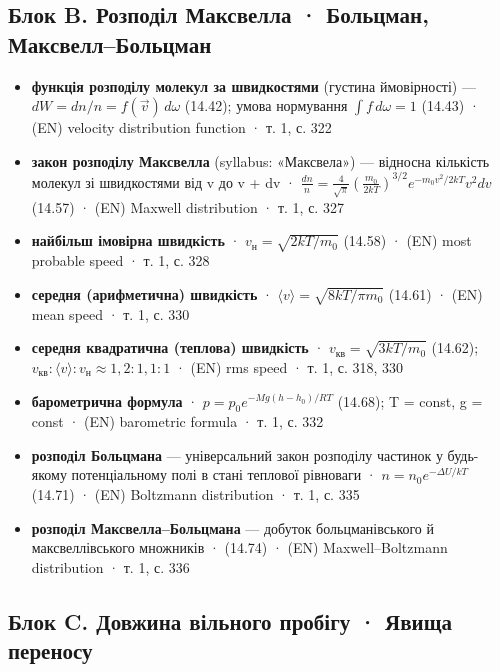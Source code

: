 \documentclass[11pt,a4paper,oneside]{book}
\newcommand{\book}{}
\begin{document}
\subsection*{Блок B. Розподіл Максвелла · Больцман, Максвелл–Больцман}

\begin{itemize}
\item \textbf{функція розподілу молекул за швидкостями} (густина ймовірності) — $dW = dn/n = f(\vec v)\,d\omega$ (14.42); умова нормування $\int f\,d\omega = 1$ (14.43) · (EN) velocity distribution function · \book{} т. 1, с. 322
\item \textbf{закон розподілу Максвелла} (syllabus: «Максвела») — відносна кількість молекул зі швидкостями від v до v + dv · $\frac{dn}{n} = \frac4{\sqrt\pi}\left(\frac{m_0}{2kT}\right)^{3/2}e^{-m_0v^2/2kT}v^2dv$ (14.57) · (EN) Maxwell distribution · \book{} т. 1, с. 327
\item \textbf{найбільш імовірна швидкість} · $v_\text{н} = \sqrt{2kT/m_0}$ (14.58) · (EN) most probable speed · \book{} т. 1, с. 328
\item \textbf{середня (арифметична) швидкість} · $\langle v\rangle = \sqrt{8kT/\pi m_0}$ (14.61) · (EN) mean speed · \book{} т. 1, с. 330
\item \textbf{середня квадратична (теплова) швидкість} · $v_{\text{кв}} = \sqrt{3kT/m_0}$ (14.62); $v_{\text{кв}} : \langle v\rangle : v_\text{н} \approx 1{,}2 : 1{,}1 : 1$ · (EN) rms speed · \book{} т. 1, с. 318, 330
\item \textbf{барометрична формула} · $p = p_0e^{-Mg(h-h_0)/RT}$ (14.68); T = const, g = const · (EN) barometric formula · \book{} т. 1, с. 332
\item \textbf{розподіл Больцмана} — універсальний закон розподілу частинок у будь-якому потенціальному полі в стані теплової рівноваги · $n = n_0e^{-\Delta U/kT}$ (14.71) · (EN) Boltzmann distribution · \book{} т. 1, с. 335
\item \textbf{розподіл Максвелла–Больцмана} — добуток больцманівського й максвеллівського множників · (14.74) · (EN) Maxwell–Boltzmann distribution · \book{} т. 1, с. 336
\end{itemize}

\subsection*{Блок C. Довжина вільного пробігу · Явища переносу}
\end{document}
